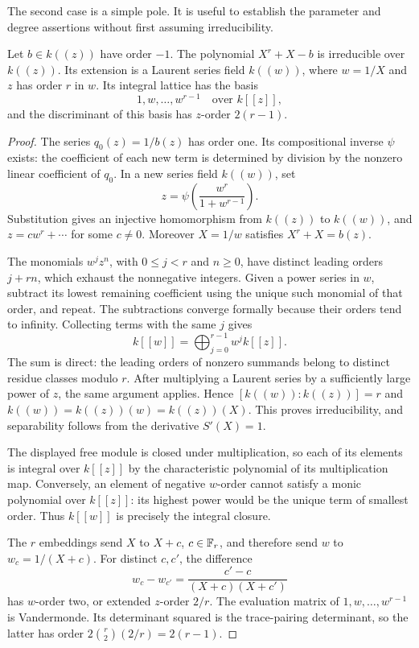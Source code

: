 The second case is a simple pole.  It is useful to establish the parameter
and degree assertions without first assuming irreducibility.

\begin{lemma}\label{lem:pencil-simple-pole}
Let $b\in k((z))$ have order $-1$.  The polynomial $X^r+X-b$ is
irreducible over $k((z))$.  Its extension is a Laurent series field
$k((w))$, where $w=1/X$ and $z$ has order $r$ in $w$.  Its integral lattice
has the basis
\[
 1,w,\ldots,w^{r-1}\quad\text{over }k[[z]],
\]
and the discriminant of this basis has $z$-order $2(r-1)$.
\end{lemma}

\begin{proof}
The series $q_0(z)=1/b(z)$ has order one.  Its compositional inverse
$\psi$ exists: the coefficient of each new term is determined by division
by the nonzero linear coefficient of $q_0$.  In a new series field
$k((w))$, set
\begin{equation}\label{eq:pencil-reparameterization}
 z=\psi\left(\frac{w^r}{1+w^{r-1}}\right).
\end{equation}
Substitution gives an injective homomorphism from $k((z))$ to $k((w))$,
and $z=cw^r+\cdots$ for some $c\ne0$.  Moreover $X=1/w$ satisfies
$X^r+X=b(z)$.

The monomials $w^jz^n$, with $0\leq j<r$ and $n\geq0$, have distinct
leading orders $j+rn$, which exhaust the nonnegative integers.  Given a
power series in $w$, subtract its lowest remaining coefficient using the
unique such monomial of that order, and repeat.  The subtractions converge
formally because their orders tend to infinity.  Collecting terms with the
same $j$ gives
\[
 k[[w]]=\bigoplus_{j=0}^{r-1}w^j k[[z]].
\]
The sum is direct: the leading orders of nonzero summands belong to
distinct residue classes modulo $r$.  After multiplying a Laurent series
by a sufficiently large power of $z$, the same argument applies.  Hence
$[k((w)):k((z))]=r$ and $k((w))=k((z))(w)=k((z))(X)$.
This proves irreducibility, and separability follows from the derivative
$S'(X)=1$.

The displayed free module is closed under multiplication, so each of its
elements is integral over $k[[z]]$ by the characteristic polynomial of its
multiplication map.  Conversely, an element of negative $w$-order cannot
satisfy a monic polynomial over $k[[z]]$: its highest power would be the
unique term of smallest order.  Thus $k[[w]]$ is precisely the integral
closure.

The $r$ embeddings send $X$ to $X+c$, $c\in\mathbb F_r$, and therefore send $w$
to $w_c=1/(X+c)$.  For distinct $c,c'$, the difference
\[
 w_c-w_{c'}=\frac{c'-c}{(X+c)(X+c')}
\]
has $w$-order two, or extended $z$-order $2/r$.  The evaluation matrix of
$1,w,\ldots,w^{r-1}$ is Vandermonde.  Its determinant squared is the
trace-pairing determinant, so the latter has order
$2\binom r2(2/r)=2(r-1)$.
\end{proof}

